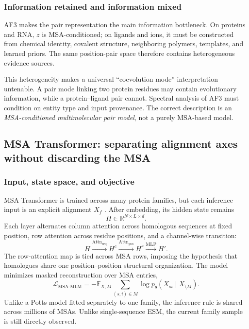 \documentclass[10pt]{article}
\newcommand{\E}{\mathbb E}
\newcommand{\R}{\mathbb R}
\begin{document}
\subsubsection{Information retained and information mixed}

AF3 makes the pair representation the main information bottleneck.  On proteins and RNA, $z$ is
MSA-conditioned; on ligands and ions, it must be constructed from chemical identity, covalent
structure, neighboring polymers, templates, and learned priors.  The same position-pair space
therefore contains heterogeneous evidence sources.

This heterogeneity makes a universal ``coevolution mode'' interpretation untenable.  A pair mode
linking two protein residues may contain evolutionary information, while a protein--ligand pair
cannot.  Spectral analysis of AF3 must condition on entity type and input provenance.  The correct
description is an \emph{MSA-conditioned multimolecular pair model}, not a purely MSA-based model.

\subsection{MSA Transformer: separating alignment axes without discarding the MSA}

\subsubsection{Input, state space, and objective}

MSA Transformer is trained across many protein families, but each inference input is an explicit
alignment $X_f$ \cite{rao2021}.  After embedding, its hidden state remains
\begin{equation}
H\in\R^{N\times L\times d}.
\end{equation}
Each layer alternates column attention across homologous sequences at fixed position, row attention
across residue positions, and a channel-wise transition:
\begin{equation}
H\xrightarrow{\operatorname{Attn}_{\mathrm{seq}}}
H^{c}\xrightarrow{\operatorname{Attn}_{\mathrm{pos}}}
H^{r}\xrightarrow{\operatorname{MLP}}H'.
\label{eq:msa-transformer-axes}
\end{equation}
The row-attention map is tied across MSA rows, imposing the hypothesis that homologues share one
position--position structural organization.  The model minimizes masked reconstruction over MSA
entries,
\begin{equation}
\mathcal L_{\mathrm{MSA\text{-}MLM}}
=-\E_{X,M}\sum_{(s,i)\in M}
\log p_\theta(X_{si}\mid X_{\setminus M}).
\label{eq:msa-transformer-loss}
\end{equation}
Unlike a Potts model fitted separately to one family, the inference rule is shared across millions
of MSAs.  Unlike single-sequence ESM, the current family sample is still directly observed.
\end{document}
